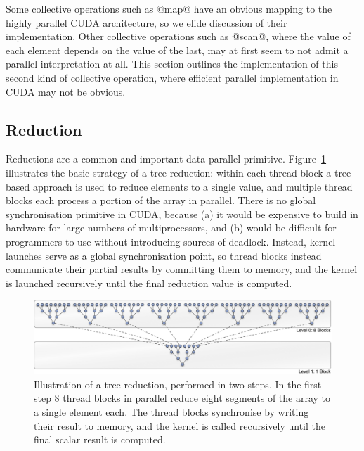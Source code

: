 Some collective operations such as @map@ have an obvious mapping to the
highly parallel CUDA architecture, so we elide discussion of their
implementation. Other collective operations such as @scan@, where the value
of each element depends on the value of the last, may at first seem to not admit
a parallel interpretation at all. This section outlines the implementation of
this second kind of collective operation, where efficient parallel
implementation in CUDA may not be obvious.


\subsection{Reduction}
\label{sec:parallel_reduction}

Reductions are a common and important data-parallel primitive.
Figure~\ref{fig:tree_reduction} illustrates the basic strategy of a tree
reduction: within each thread block a tree-based approach is used to reduce
elements to a single value, and multiple thread blocks each process a portion of
the array in parallel. There is no global synchronisation primitive in CUDA,
because (a) it would be expensive to build in hardware for large numbers of
multiprocessors, and (b) would be difficult for programmers to use without
introducing sources of deadlock. Instead, kernel launches serve as a global
synchronisation point, so thread blocks instead communicate their partial
results by committing them to memory, and the kernel is launched recursively
until the final reduction value is computed.

\begin{figure}
    \begin{center}
        \includegraphics[width=\textwidth]{images/sec-4/tree-reduction}
    \end{center}
    \caption[A parallel tree reduction]{Illustration of a tree reduction,
        performed in two steps. In the first step 8 thread blocks in parallel
        reduce eight segments of the array to a single element each. The thread
        blocks synchronise by writing their result to memory, and the kernel is
    called recursively until the final scalar result is computed.}
    \label{fig:tree_reduction}
\end{figure}

